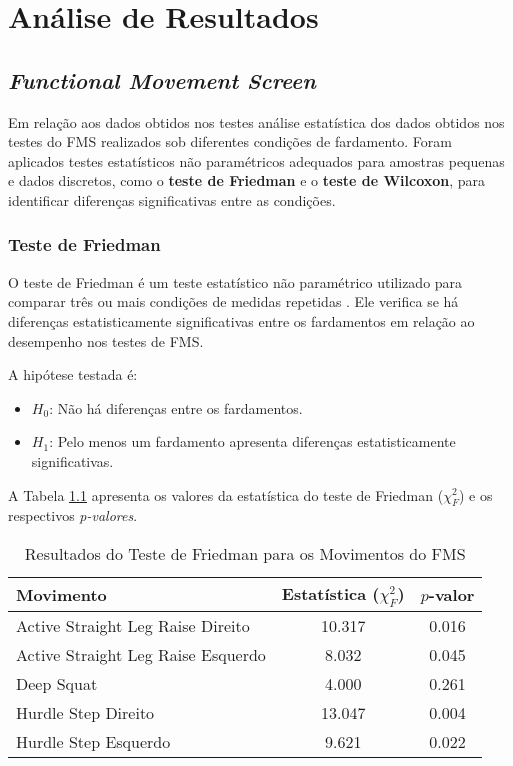 \chapter{Análise de Resultados}

\section{\textit{Functional Movement Screen}}

    Em relação aos dados obtidos nos testes análise estatística dos dados obtidos nos testes do \acrlong{FMS} realizados sob diferentes condições de fardamento. Foram aplicados testes estatísticos não paramétricos adequados para amostras pequenas e dados discretos, como o \textbf{teste de Friedman} e o \textbf{teste de Wilcoxon}, para identificar diferenças significativas entre as condições.

    \subsection{Teste de Friedman}
        O teste de Friedman é um teste estatístico não paramétrico utilizado para comparar três ou mais condições de medidas repetidas \cite{sheldon1996use}. Ele verifica se há diferenças estatisticamente significativas entre os fardamentos em relação ao desempenho nos testes de FMS.

        A hipótese testada é:
        \begin{itemize}
            \item $H_0$: Não há diferenças entre os fardamentos.
            \item $H_1$: Pelo menos um fardamento apresenta diferenças estatisticamente significativas.
            \end{itemize}

        A Tabela \ref{tab:friedman} apresenta os valores da estatística do teste de Friedman ($\chi^2_F$) e os respectivos \textit{p-valores}.

        \begin{table}[H]
            \centering
            \caption{Resultados do Teste de Friedman para os Movimentos do FMS}
            \label{tab:friedman}
            \begin{tabular}{lcc}
                \hline
                \textbf{Movimento} & \textbf{Estatística ($\chi^2_F$)} & \textbf{$p$-valor} \\
                \hline
                Active Straight Leg Raise Direito  & 10.317 & 0.016  \\
                Active Straight Leg Raise Esquerdo &  8.032 & 0.045  \\
                Deep Squat                        &  4.000 & 0.261  \\
                Hurdle Step Direito               & 13.047 & 0.004  \\
                Hurdle Step Esquerdo              &  9.621 & 0.022  \\
                \hline
            \end{tabular}
            \end{table}

